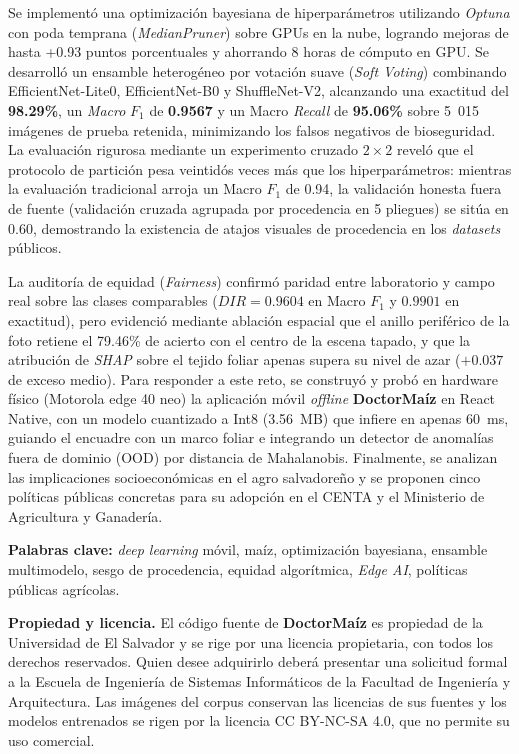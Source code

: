 \documentclass[12pt,letterpaper]{article}
\begin{document}
Se implement\'o una optimizaci\'on bayesiana de hiperpar\'ametros utilizando \textit{Optuna} con poda temprana (\textit{MedianPruner}) sobre GPUs en la nube, logrando mejoras de hasta +0.93 puntos porcentuales y ahorrando 8 horas de c\'omputo en GPU. Se desarroll\'o un ensamble heterog\'eneo por votaci\'on suave (\textit{Soft Voting}) combinando EfficientNet-Lite0, EfficientNet-B0 y ShuffleNet-V2, alcanzando una exactitud del \textbf{98.29\%}, un \textit{Macro} $F_1$ de \textbf{0.9567} y un Macro \textit{Recall} de \textbf{95.06\%} sobre 5~015 im\'agenes de prueba retenida, minimizando los falsos negativos de bioseguridad. La evaluaci\'on rigurosa mediante un experimento cruzado $2\times2$ revel\'o que el protocolo de partici\'on pesa veintid\'os veces m\'as que los hiperpar\'ametros: mientras la evaluaci\'on tradicional arroja un Macro $F_1$ de 0.94, la validaci\'on honesta fuera de fuente (validaci\'on cruzada agrupada por procedencia en 5 pliegues) se sit\'ua en 0.60, demostrando la existencia de atajos visuales de procedencia en los \textit{datasets} p\'ublicos.

La auditor\'ia de equidad (\textit{Fairness}) confirm\'o paridad entre laboratorio y campo real sobre las clases comparables ($DIR = 0.9604$ en Macro $F_1$ y $0.9901$ en exactitud), pero evidenci\'o mediante ablaci\'on espacial que el anillo perif\'erico de la foto retiene el 79.46\% de acierto con el centro de la escena tapado, y que la atribuci\'on de \textit{SHAP} sobre el tejido foliar apenas supera su nivel de azar ($+0.037$ de exceso medio). Para responder a este reto, se construy\'o y prob\'o en hardware f\'isico (Motorola edge 40 neo) la aplicaci\'on m\'ovil \textit{offline} \textbf{DoctorMa\'iz} en React Native, con un modelo cuantizado a Int8 (3.56~MB) que infiere en apenas 60~ms, guiando el encuadre con un marco foliar e integrando un detector de anomal\'ias fuera de dominio (OOD) por distancia de Mahalanobis. Finalmente, se analizan las implicaciones socioecon\'omicas en el agro salvadore\~no y se proponen cinco pol\'iticas p\'ublicas concretas para su adopci\'on en el CENTA y el Ministerio de Agricultura y Ganader\'ia.

\noindent\textbf{Palabras clave:} \textit{deep learning} m\'ovil, ma\'iz, optimizaci\'on bayesiana, ensamble multimodelo, sesgo de procedencia, equidad algor\'itmica, \textit{Edge AI}, pol\'iticas p\'ublicas agr\'icolas.

\bigskip
\noindent\textbf{Propiedad y licencia.} El c\'odigo fuente de \textbf{DoctorMa\'iz} es propiedad de la Universidad de El Salvador y se rige por una licencia propietaria, con todos los derechos reservados. Quien desee adquirirlo deber\'a presentar una solicitud formal a la Escuela de Ingenier\'ia de Sistemas Inform\'aticos de la Facultad de Ingenier\'ia y Arquitectura. Las im\'agenes del corpus conservan las licencias de sus fuentes y los modelos entrenados se rigen por la licencia CC BY-NC-SA 4.0, que no permite su uso comercial.
\end{document}
